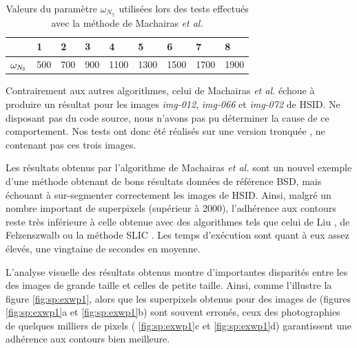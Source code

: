  \begin{table}[htb]
\caption{Valeurs du paramètre $\omega_{N_{\mathbb{S}}}$ utilisées lors des tests effectués avec la méthode de Machairas \textit{et al.}}
\centering
\begin{tabular}{|l|l|l|l|l|l|l|l|l|}
\hline
\cellcolor{gris}{\modif{Test}  }& 1 & 2 & 3 &4 & 5&6 &7 &8 \\
\hline
$\cellcolor{gris}{\omega_{N_{\mathbb{S}}}}$&500&700&900&1100&1300&1500&1700&1900 \\
\hline
\end{tabular}
\label{tab:sp:WPParam}
\end{table}

 Contrairement aux autres algorithmes, celui de Machairas \textit{et al.} échoue à produire un résultat pour les images \emph{img-012}, \emph{img-066} et \emph{img-072} de HSID. Ne disposant pas du code source, nous n'avons pas pu déterminer la cause de ce comportement. Nos tests ont donc été réalisés sur une version tronquée , ne contenant pas ces trois images.
 

Les résultats obtenus par l'algorithme de Machairas \textit{et al.} sont un nouvel exemple d'une méthode obtenant de bons résultats  données de référence BSD, mais échouant à sur-segmenter correctement les images de HSID. Ainsi, malgré un nombre important de superpixels (supérieur à 2000), l'adhérence aux contours reste très inférieure à celle obtenue avec des algorithmes tels que celui de Liu \cite{liu2011entropy}, de Felzenszwalb \cite{felzenszwalb2004efficient} ou la méthode SLIC \cite{achanta2012slic}. Les temps d’exécution sont quant à eux assez élevés, une vingtaine de secondes en moyenne. 
 
 L'analyse visuelle des résultats obtenus montre d'importantes disparités entre les  des images de grande taille et celles de petite taille. Ainsi, comme l'illustre la figure \ref{fig:sp:exwp1}, alors que les superpixels obtenus pour des images de  (figures \ref{fig:sp:exwp1}a et \ref{fig:sp:exwp1}b) sont souvent erronés, ceux des photographies de quelques milliers de pixels ( \ref{fig:sp:exwp1}c et \ref{fig:sp:exwp1}d) garantissent une adhérence aux contours bien meilleure.
 


